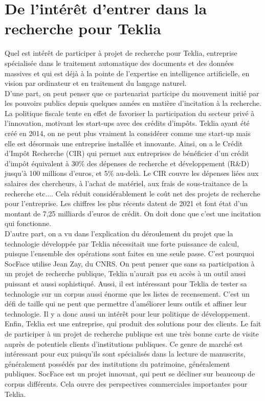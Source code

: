 \section{De l'intérêt d'entrer dans la recherche pour Teklia}

Quel est intérêt de participer à projet de recherche pour Teklia, entreprise spécialisée dans le traitement automatique des documents et des données massives et qui est déjà à la pointe de l’expertise en intelligence artificielle, en vision par ordinateur et en traitement du langage naturel. \\

D’une part, on peut penser que ce partenariat participe du mouvement initié par les pouvoirs publics depuis quelques années en matière d’incitation à la recherche. La politique fiscale tente en effet de favoriser la participation du secteur privé à l’innovation, motivant les start-ups avec des crédits d’impôts. Teklia ayant été créé en 2014, on ne peut plus vraiment la considérer comme une start-up mais elle est désormais une entreprise installée et innovante. Ainsi, on a le Crédit d'Impôt Recherche (CIR) qui permet aux entreprises de bénéficier d’un crédit d’impôt équivalent à 30\% des dépenses de recherche et développement (R\&D) jusqu'à 100 millions d'euros, et 5\% au-delà. Le CIR couvre les dépenses liées aux salaires des chercheurs, à l'achat de matériel, aux frais de sous-traitance de la recherche etc.... Cela réduit considérablement le coût net des projets de recherche pour l’entreprise. Les chiffres les plus récents datent de 2021 et font état d’un montant de 7,25 milliards d’euros de crédit. On doit donc que c’est une incitation qui fonctionne. \\
D’autre part, on a vu dans l’explication du déroulement du projet que la technologie développée par Teklia nécessitait une forte puissance de calcul, puisque l’ensemble des opérations sont faites en une seule passe. C’est pourquoi SocFace utilise Jean Zay, du CNRS. On peut penser que sans sa participation à un projet de recherche publique, Teklia n’aurait pas eu accès à un outil aussi puissant et aussi sophistiqué. Aussi, il est intéressant pour Teklia de tester sa technologie sur un corpus aussi énorme que les listes de recensement. C’est un défi de taille qui ne peut que permettre d’améliorer leurs outils et affiner leur technologie. Il y a donc aussi un intérêt pour leur politique de développement.\\
Enfin, Teklia est une entreprise, qui produit des solutions pour des clients. Le fait de participer à un projet de recherche publique est une très bonne carte de visite auprès de potentiels clients d’institutions publiques. Ce genre de marché est intéressant pour eux puisqu’ils sont spécialisés dans la lecture de manuscrits, généralement possédés par des institutions du patrimoine, généralement publiques. SocFace est un projet innovant, qui peut se décliner sur beaucoup de corpus différents. Cela ouvre des perspectives commerciales importantes pour Teklia.\\

